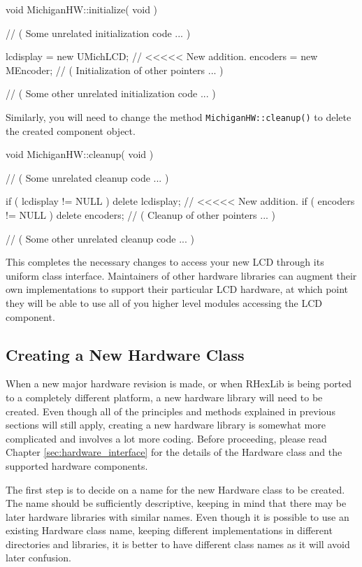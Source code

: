 \begin{codesegment}
void MichiganHW::initialize( void ) {

  // ( Some unrelated initialization code ... )

  lcdisplay = new UMichLCD;        // <<<<< New addition.
  encoders = new MEncoder;
  // ( Initialization of other pointers ... )

  // ( Some other unrelated initialization code ... )
}
\end{codesegment}

Similarly, you will need to change the method {\tt MichiganHW::cleanup()} to
delete the created component object.

\begin{codesegment}
void MichiganHW::cleanup( void ) {

  // ( Some unrelated cleanup code ... )

  if ( lcdisplay != NULL ) delete lcdisplay;        // <<<<< New addition.
  if ( encoders != NULL ) delete encoders;
  // ( Cleanup of other pointers ... )

  // ( Some other unrelated cleanup code ... )
}
\end{codesegment}

This completes the necessary changes to access your new LCD through its
uniform class interface. Maintainers of other hardware libraries can augment
their own implementations to support their particular LCD hardware, at which
point they will be able to use all of you higher level modules accessing the
LCD component. 

\subsection{Creating a New Hardware Class}
\label{sec:new_hardware_class}

When a new major hardware revision is made, or when RHexLib is being ported
to a completely different platform, a new hardware library will need to be
created. Even though all of the principles and methods explained in previous
sections will still apply, creating a new hardware library is somewhat more
complicated and involves a lot more coding. Before proceeding, please read
Chapter \ref{sec:hardware_interface} for the details of the Hardware class
and the supported hardware components.

The first step is to decide on a name for the new Hardware class to be
created. The name should be sufficiently descriptive, keeping in mind that
there may be later hardware libraries with similar names. Even though it is
possible to use an existing Hardware class name, keeping different
implementations in different directories and libraries, it is better to have
different class names as it will avoid later confusion.

